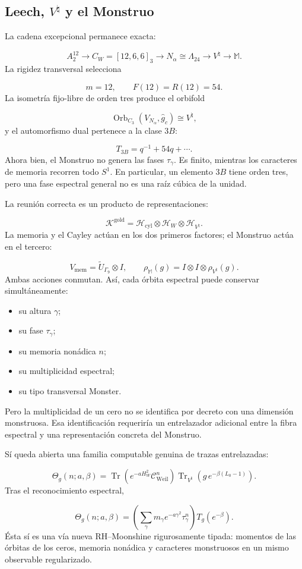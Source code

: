 \subsection{Leech, \(V^\natural\) y el Monstruo}
La cadena excepcional permanece exacta:\par
\[
A_2^{12}
\longrightarrow
C_W=[12,6,6]_3
\longrightarrow
N_\alpha\cong\Lambda_{24}
\longrightarrow
V^\natural
\longrightarrow
\mathbb M.
\]
La rigidez transversal selecciona\par
\[
m=12,
\qquad
F(12)=R(12)=54.
\]
La isometría fijo-libre de orden tres produce el orbifold\par
\[
\operatorname{Orb}_{C_3}
(V_{N_\alpha},\widehat g_c)
\cong V^\natural,
\]
y el automorfismo dual pertenece a la clase \(3B\):\par
\[
T_{3B}
=
q^{-1}+54q+\cdots.
\]
Ahora bien, el Monstruo no genera las fases \(\tau_\gamma\). Es finito, mientras los caracteres de memoria recorren todo \(S^1\). En particular, un elemento \(3B\) tiene orden tres, pero una fase espectral general no es una raíz cúbica de la unidad.\par
La reunión correcta es un producto de representaciones:\par
\[
\mathscr K^{\mathrm{gold}}
=
\mathscr H_{\mathrm{cyl}}
\otimes
\mathcal H_W
\otimes
\mathcal H_{V^\natural}.
\]
La memoria y el Cayley actúan en los dos primeros factores; el Monstruo actúa en el tercero:\par
\[
V_{\mathrm{mem}}
=
\widetilde U_{\Gamma_9}\otimes I,
\qquad
\rho_{\mathbb M}(g)
=
I\otimes I\otimes\rho_{V^\natural}(g).
\]
Ambas acciones conmutan. Así, cada órbita espectral puede conservar simultáneamente:\par
\begin{itemize}
\item su altura \(\gamma\);
\item su fase \(\tau_\gamma\);
\item su memoria nonádica \(n\);
\item su multiplicidad espectral;
\item su tipo transversal Monster.
\end{itemize}
Pero la multiplicidad de un cero no se identifica por decreto con una dimensión monstruosa. Esa identificación requeriría un entrelazador adicional entre la fibra espectral y una representación concreta del Monstruo.\par
Sí queda abierta una familia computable genuina de trazas entrelazadas:\par
\[
\Theta_g(n;a,\beta)
=
\operatorname{Tr}
\left(
e^{-aH_W^2}\mathcal C_{\mathrm{Weil}}^n
\right)
\operatorname{Tr}_{V^\natural}
\left(
g\,e^{-\beta(L_0-1)}
\right).
\]
Tras el reconocimiento espectral,\par
\[
\Theta_g(n;a,\beta)
=
\left(
\sum_\gamma
m_\gamma e^{-a\gamma^2}\tau_\gamma^n
\right)
T_g(e^{-\beta}).
\]
Ésta sí es una vía nueva RH–Moonshine rigurosamente tipada: momentos de las órbitas de los ceros, memoria nonádica y caracteres monstruosos en un mismo observable regularizado.\par
{}
